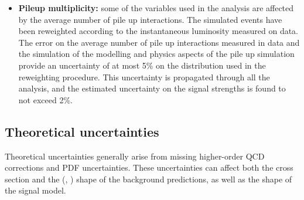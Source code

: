 \begin{itemize}
\item {\bf Pileup multiplicity:} 
some of the variables used in the analysis are affected by the average number of pile up interactions. The simulated events have been reweighted according to the instantaneous luminosity measured on data. The error on the average number of pile up interactions measured in data and the simulation of the modelling and physics aspects of the pile up simulation provide an uncertainty of at most 5\% on the distribution used in the reweighting procedure. This uncertainty is propagated through all the analysis, and the estimated uncertainty on the signal strengths is found to not exceed 2\%.
\end{itemize}

\subsection{Theoretical uncertainties \label{subsec:thsyst}}

Theoretical uncertainties generally arise from missing higher-order QCD corrections and PDF uncertainties. These uncertainties can affect both the cross section and the (\mll, \mt) shape of the background predictions, as well as the shape of the signal model.

